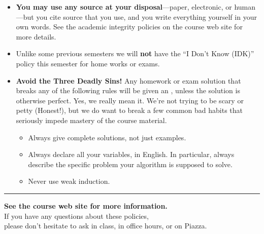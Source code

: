 \documentclass[11pt]{article}
\begin{document}
\begin{itemize}
\item \textbf{You may use any source at your disposal}—paper,
  electronic, or human—but you  cite  source
  that you use, and you  write everything yourself in your
  own words.  See the academic integrity policies on the course web
  site for more details.

\item Unlike some previous semesters we will \textbf{not} have the ``I
  Don't Know (IDK)'' policy this semester for home works or exams. 

\item
\textbf{Avoid the Three Deadly Sins!}  Any homework or exam solution that breaks any of the following rules will be given an \textcolor{Red}{}, unless the solution is otherwise perfect.  Yes, we really mean it.  We’re not trying to be scary or petty (Honest!), but we do want to break a few common bad habits that seriously impede mastery of the course material.
\begin{itemize}\itemsep0pt
\item Always give complete solutions, not just examples.
\item Always declare all your variables, in English.  In particular, always describe the specific problem your algorithm is supposed to solve.
\item Never use weak induction.
\end{itemize}

\end{itemize}
\bigskip
\hrule

\begin{center}
\large \textbf{See the course web site for more information.}\\[1ex]\normalsize
If you have any questions about these policies,\\
please don’t hesitate to ask in class, in office hours, or on Piazza.
\end{center}
\end{document}
